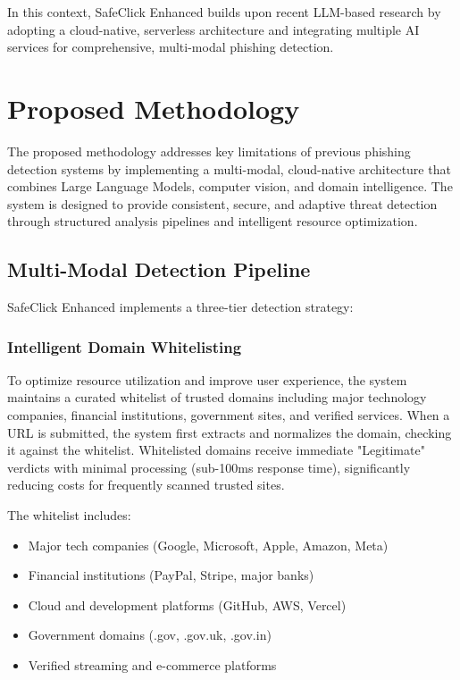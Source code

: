 \documentclass[conference]{IEEEtran}
\begin{document}
In this context, SafeClick Enhanced builds upon recent LLM-based research by adopting a cloud-native, serverless architecture and integrating multiple AI services for comprehensive, multi-modal phishing detection.


\section{Proposed Methodology}

The proposed methodology addresses key limitations of previous phishing detection systems by implementing a multi-modal, cloud-native architecture that combines Large Language Models, computer vision, and domain intelligence. The system is designed to provide consistent, secure, and adaptive threat detection through structured analysis pipelines and intelligent resource optimization.

\subsection{Multi-Modal Detection Pipeline}

SafeClick Enhanced implements a three-tier detection strategy:

\subsubsection{Intelligent Domain Whitelisting}

To optimize resource utilization and improve user experience, the system maintains a curated whitelist of trusted domains including major technology companies, financial institutions, government sites, and verified services. When a URL is submitted, the system first extracts and normalizes the domain, checking it against the whitelist. Whitelisted domains receive immediate "Legitimate" verdicts with minimal processing (sub-100ms response time), significantly reducing costs for frequently scanned trusted sites.

The whitelist includes:
\begin{itemize}
\item Major tech companies (Google, Microsoft, Apple, Amazon, Meta)
\item Financial institutions (PayPal, Stripe, major banks)
\item Cloud and development platforms (GitHub, AWS, Vercel)
\item Government domains (.gov, .gov.uk, .gov.in)
\item Verified streaming and e-commerce platforms
\end{itemize}
\end{document}
